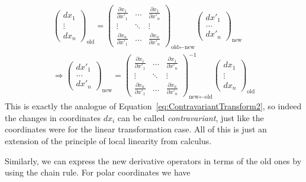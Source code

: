 \documentclass[../master.tex]{subfiles}
\begin{document}
	\begin{align*}
		\begin{pmatrix}
			dx_1 \\ \vdots \\ dx_n 
		\end{pmatrix}_{\text{old}}
		=
	 \begin{pmatrix}
	 	\frac{\partial x_1}{\partial x'_1} & \dots & \frac{\partial x_1}{\partial x'_n} \\
		\vdots & \ddots & \vdots \\
		\frac{\partial x_n}{\partial x'_1} & \dots & \frac{\partial x_n}{\partial x'_n}
	 \end{pmatrix}_{\text{old} \leftarrow \text{new}}
	 \begin{pmatrix}
	 	dx'_1 \\ \dots \\ dx'_n
	 \end{pmatrix}_{\text{new}}\\
	 \Rightarrow 
	 \begin{pmatrix}
	 	dx'_1 \\ \dots \\ dx'_n
	 \end{pmatrix}_{\text{new}}
		=
	 \begin{pmatrix}
	 	\frac{\partial x_1}{\partial x'_1} & \dots & \frac{\partial x_1}{\partial x'_n} \\
		\vdots & \ddots & \vdots \\
		\frac{\partial x_n}{\partial x'_1} & \dots & \frac{\partial x_n}{\partial x'_n}
	 \end{pmatrix}^{-1}_{\text{new} \leftarrow \text{old}}
	\begin{pmatrix}
		dx_1 \\ \vdots \\ dx_n 
	\end{pmatrix}_{\text{old}}
	\end{align*}
	This is exactly the analogue of Equation~\eqref{eq:ContravariantTransform2}, so indeed the changes in coordinates $dx_i$ can be called \emph{contravariant}, just like the coordinates were for the linear transformation case. All of this is just an extension of the principle of local linearity from calculus.
	
	Similarly, we can express the new derivative operators in terms of the old ones by using the chain rule. For polar coordinates we have
	
\end{document}
